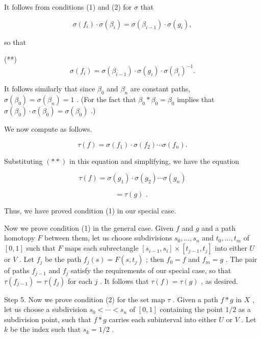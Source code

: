 \documentclass[10pt]{article}
\begin{document}
It follows from conditions (1) and (2) for \(\sigma\) that

\[
\sigma \left( {f}_{i}\right)  \cdot  \sigma \left( {\beta }_{i}\right)  = \sigma \left( {\beta }_{i - 1}\right)  \cdot  \sigma \left( {g}_{i}\right) ,
\]

so that

(**)
\[
\sigma \left( {f}_{i}\right)  = \sigma \left( {\beta }_{i - 1}\right)  \cdot  \sigma \left( {g}_{i}\right)  \cdot  \sigma {\left( {\beta }_{i}\right) }^{-1}.
\]

It follows similarly that since \({\beta }_{0}\) and \({\beta }_{n}\) are constant paths, \(\sigma \left( {\beta }_{0}\right)  = \sigma \left( {\beta }_{n}\right)  = 1\) . (For the fact that \({\beta }_{0} * {\beta }_{0} = {\beta }_{0}\) implies that \(\sigma \left( {\beta }_{0}\right)  \cdot  \sigma \left( {\beta }_{0}\right)  = \sigma \left( {\beta }_{0}\right)\) .)

We now compute as follows.

\[
\tau \left( f\right)  = \sigma \left( {f}_{1}\right)  \cdot  \sigma \left( {f}_{2}\right) \cdots \sigma \left( {f}_{n}\right) .
\]

Substituting \(\left( {* * }\right)\) in this equation and simplifying, we have the equation

\[
\tau \left( f\right)  = \sigma \left( {g}_{1}\right)  \cdot  \sigma \left( {g}_{2}\right) \cdots \sigma \left( {g}_{n}\right)
\]

\[
= \tau \left( g\right) \text{ . }
\]

Thus, we have proved condition (1) in our special case.

Now we prove condition (1) in the general case. Given \(f\) and \(g\) and a path homotopy \(F\) between them, let us choose subdivisions \({s}_{0},\ldots ,{s}_{n}\) and \({t}_{0},\ldots ,{t}_{m}\) of \(\left\lbrack  {0,1}\right\rbrack\) such that \(F\) maps each subrectangle \(\left\lbrack  {{s}_{i - 1},{s}_{i}}\right\rbrack   \times  \left\lbrack  {{t}_{j - 1},{t}_{j}}\right\rbrack\) into either \(U\) or \(V\) . Let \({f}_{j}\) be the path \({f}_{j}\left( s\right)  = F\left( {s,{t}_{j}}\right)\) ; then \({f}_{0} = f\) and \({f}_{m} = g\) . The pair of paths \({f}_{j - 1}\) and \({f}_{j}\) satisfy the requirements of our special case, so that \(\tau \left( {f}_{j - 1}\right)  = \tau \left( {f}_{j}\right)\) for each \(j\) . It follows that \(\tau \left( f\right)  = \tau \left( g\right)\) , as desired.

Step 5. Now we prove condition (2) for the set map \(\tau\) . Given a path \(f * g\) in \(X\) , let us choose a subdivision \({s}_{0} < \cdots  < {s}_{n}\) of \(\left\lbrack  {0,1}\right\rbrack\) containing the point \(1/2\) as a subdivision point, such that \(f * g\) carries each subinterval into either \(U\) or \(V\) . Let \(k\) be the index such that \({s}_{k} = 1/2\) .
\end{document}
